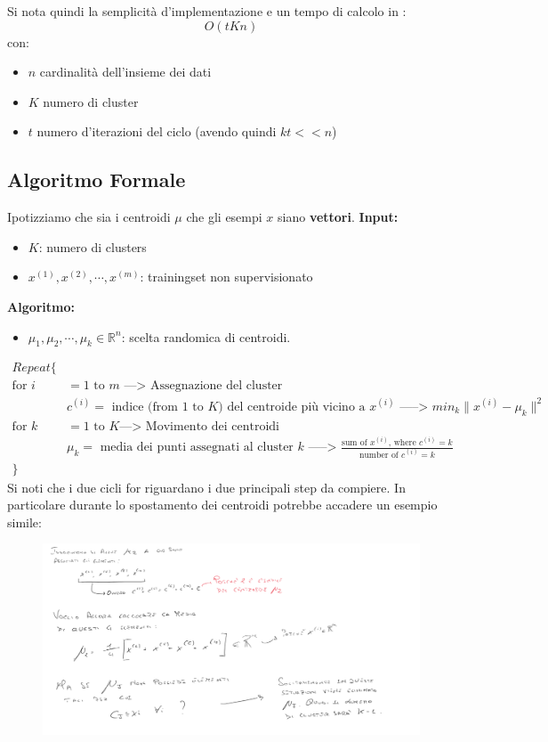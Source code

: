 Si nota quindi la semplicità d'implementazione e un tempo di calcolo in :
\[O(tKn)\]
con:
\begin{itemize}
  \item $n$ cardinalità dell'insieme dei dati
  \item $K$ numero di cluster
  \item $t$ numero d'iterazioni del ciclo (avendo quindi $kt<<n$)
\end{itemize}
\subsection{Algoritmo Formale}
Ipotizziamo che sia i centroidi $\mu$ che gli esempi $x$ siano \textbf{vettori}.
\textbf{Input:}
\begin{itemize}
    \item  $K$: numero di clusters
    \item $x^{(1)}, x^{(2)}, \cdots, x^{(m)}$: trainingset non supervisionato
\end{itemize}
\textbf{Algoritmo:}
\begin{itemize}
    \item $\mu_1, \mu_2, \cdots, \mu_k \in \mathbb{R}^n$: scelta randomica di centroidi.
\end{itemize}
\begin{align*}
Repeat \{ \\
    \text{for }i &= 1\text{ to }m \text{ ---> Assegnazione del cluster}\\
        & c^{(i)} =\text{ indice (from }1\text{ to }K\text{) del centroide più vicino a }x^{(i)}\text{ -----> } min_k \lVert x^{(i)} - \mu_k \rVert^2 \\
    \text{for }k &= 1\text{ to }K \text{---> Movimento dei centroidi} \\
        & \mu_k =\text{ media dei punti assegnati al cluster }k\text{ -----> } \frac {\text{sum of } x^{(i)}\text{, where }c^{(i)} = k} {\text{number of }c^{(i)} = k} \\
\}
\end{align*} %
Si noti che i due cicli for riguardano i due principali step da compiere. In particolare durante lo spostamento dei centroidi potrebbe accadere un esempio simile:
\begin{figure}[H]
    \centering
    \includegraphics[width=1\textwidth]{img/kmeans16.PNG}
\end{figure}
